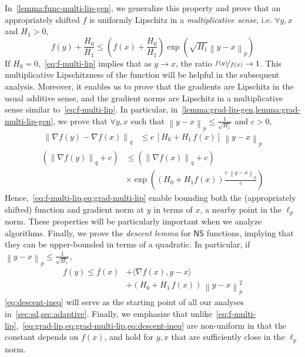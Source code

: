 \documentclass{article}
\newcommand{\normsq}[1]{\left\|#1 \right\|^{2}}
\newcommand{\norm}[1]{\left\|#1 \right\|}
\newcommand{\NS}{\textsf{NS}}
\begin{document}
In~\cref{lemma:func-multi-lip-gen}, we generalize this property and prove that an appropriately shifted $f$ is uniformly Lipschitz in a \textit{multiplicative sense}, i.e. $\forall y,x$ and $H_1 > 0$,
\begin{equation}
f(y) + \frac{H_0}{H_1}  \leq \left(f(x) + \frac{H_0}{H_1}\right) \exp\left(\sqrt{H_1} \norm{y - x}_p \right)     
\label{eq:f-multi-lip}
\end{equation}
If $H_0 = 0$,~\cref{eq:f-multi-lip} implies that as $y \to x$, the ratio $\nicefrac{f(y)}{f(x)} \to 1$. This multiplicative Lipschitzness of the function will be helpful in the subsequent analysis. Moreover, it enables us to prove that the gradients are Lipschitz in the usual additive sense, and the gradient norms are Lipschitz in a multiplicative sense similar to~\cref{eq:f-multi-lip}. In particular, in~\cref{lemma:grad-lip-gen,lemma:grad-multi-lip-gen}, we prove that $\forall y,x$  such that $\norm{y - x}_p \leq \frac{1}{\sqrt{H_1}}$ and $c > 0$, 
\begin{align}
\norm{\nabla f(y) - \nabla f(x)}_{q} & \leq e \, [H_0 + H_1 \, f(x)] \,  \norm{y - x}_p \label{eq:grad-lip} 
\end{align}
\begin{align}
\left(\norm{\nabla f(y)}_q  + c\right) & \leq \left(\norm{\nabla f(x)}_q + c \right) \label{eq:grad-multi-lip}  \\
& \times \exp\left((H_0 + H_1  f(x)) \frac{e \, \norm{y - x}_p}{c} \right) \nonumber 
\end{align}
Hence,~\cref{eq:f-multi-lip,eq:grad-multi-lip} enable bounding both the (appropriately shifted) function and gradient norm at $y$ in terms of $x$, a nearby point in the $\ell_p$ norm. These properties will be particularly important when we analyze algorithms. Finally, we prove the \textit{descent lemma} for $\NS$ functions, implying that they can be upper-bounded in terms of a quadratic. In particular, if $\norm{y - x}_p \leq \frac{1}{\sqrt{H_1}}$, 
\begin{align}
f(y) \leq f(x) & + \langle \nabla f(x), y - x \rangle \nonumber \\ & + \left(H_0+ H_1 \, f(x) \right) \, \normsq{y - x}_p \label{eq:descent-ineq}
\end{align}
\cref{eq:descent-ineq} will serve as the starting point of all our analyses in~\cref{sec:sd,sec:adaptive}. Finally, we emphasize that unlike~\cref{eq:f-multi-lip},~\cref{eq:grad-lip,eq:grad-multi-lip,eq:descent-ineq} are non-uniform in that the constant depends on $f(x)$, and hold for $y,x$ that are sufficiently close in the $\ell_p$ norm. 
\end{document}
